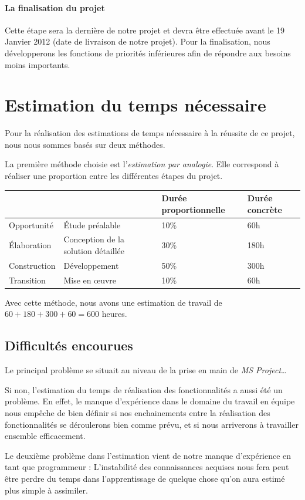 \paragraph{La finalisation du projet}

Cette étape sera la dernière de notre projet et devra être effectuée avant le 19 Janvier 2012 (date de livraison de notre projet).
Pour la finalisation, nous développerons les fonctions de priorités inférieures afin de répondre aux besoins moins importants. 

\section{Estimation du temps nécessaire}
Pour la réalisation des estimations de temps nécessaire à la réussite de ce projet,
nous nous sommes basés sur deux méthodes. 

La première méthode choisie est l'\emph{estimation par analogie}.
Elle correspond à réaliser une proportion entre les différentes étapes du projet. 

\begin{tabular}{|l l|l|l|}
\hline
&& Durée proportionnelle & Durée concrète \\
\hline
Opportunité & Étude préalable & 10\% & 60h \\
\hline
Élaboration & Conception de la solution détaillée & 30\% & 180h \\
\hline
Construction & Développement & 50\% & 300h \\
\hline
Transition & Mise en œuvre & 10\% & 60h \\
\hline
\end{tabular}

Avec cette méthode, nous avons une estimation de travail de $60 + 180 + 300 + 60 = 600$ heures. 

\subsection{Difficultés encourues} 
Le principal problème se situait au niveau de la prise en main de \emph{MS Project}…

Si non, l'estimation du temps de réalisation des fonctionnalités a aussi été un problème. 
En effet, le manque d'expérience dans le domaine du travail en équipe nous empêche de bien définir si nos enchainements entre la réalisation des fonctionnalités se  déroulerons bien comme prévu, et si nous arriverons à travailler ensemble efficacement. 

Le deuxième problème dans l'estimation vient de notre manque d'expérience en tant que programmeur :
L'instabilité des connaissances acquises nous fera peut être perdre du temps dans l'apprentissage de quelque chose qu'on aura estimé plus simple à assimiler. 


